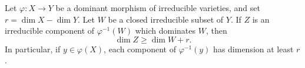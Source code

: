 Let $\varphi: X \rightarrow Y$ be a dominant morphism of irreducible varieties, and set $r = \dim X - \dim Y$. Let $W$ be a closed irreducible subset of $Y$. If $Z$ is an irreducible component of $\varphi^{-1}(W)$ which dominates $W$, then
$$\dim Z \geqslant \dim W + r.$$
In particular, if $y \in \varphi(X)$, each component of $\varphi^{-1}(y)$ has dimension at least $r$.
